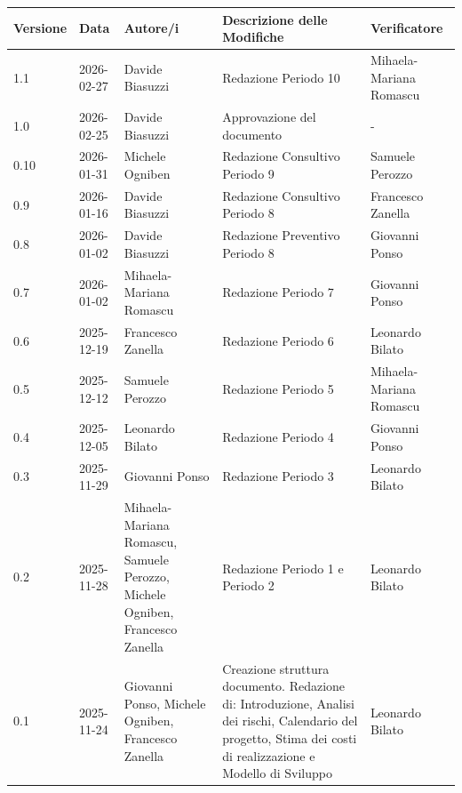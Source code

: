 \documentclass[a4paper, 11pt, oneside]{scrartcl} %
\begin{document}
\begin{center}
\renewcommand{\arraystretch}{1.2}
\begin{tabularx}{\textwidth}{@{}p{}p{}p{}X>{\centering\arraybackslash}p{}@{}}
\toprule
\textbf{Versione} & \textbf{Data} & \textbf{Autore/i} & \textbf{Descrizione delle Modifiche} & \textbf{Verificatore} \\
\midrule
1.1 & 2026-02-27 & Davide Biasuzzi & Redazione Periodo 10 & Mihaela-Mariana Romascu \\
1.0 & 2026-02-25 & Davide Biasuzzi & Approvazione del documento & - \\
0.10 & 2026-01-31 & Michele Ogniben & Redazione Consultivo Periodo 9 & Samuele Perozzo \\
0.9 & 2026-01-16 & Davide Biasuzzi & Redazione Consultivo Periodo 8 & Francesco Zanella \\
0.8 & 2026-01-02 & Davide Biasuzzi & Redazione Preventivo Periodo 8 & Giovanni Ponso \\
0.7 & 2026-01-02 & Mihaela-Mariana Romascu & Redazione Periodo 7 & Giovanni Ponso \\
0.6 & 2025-12-19 & Francesco Zanella & Redazione Periodo 6 & Leonardo Bilato \\
0.5 & 2025-12-12 & Samuele Perozzo & Redazione Periodo 5 & Mihaela-Mariana Romascu \\
0.4 & 2025-12-05 & Leonardo Bilato & Redazione Periodo 4 & Giovanni Ponso \\
0.3 & 2025-11-29 & Giovanni Ponso & Redazione Periodo 3 & Leonardo Bilato \\
0.2 & 2025-11-28 & Mihaela-Mariana Romascu, Samuele Perozzo, Michele Ogniben, Francesco Zanella & Redazione Periodo 1 e Periodo 2 & Leonardo Bilato \\
0.1 & 2025-11-24 & Giovanni Ponso, Michele Ogniben, Francesco Zanella & Creazione struttura documento. Redazione di: Introduzione, Analisi dei rischi, Calendario del progetto, Stima dei costi di realizzazione e Modello di Sviluppo & Leonardo Bilato \\
\bottomrule
\end{tabularx}
\end{center}

\newpage
\tableofcontents 
\pagestyle{fancy} 

\newpage
\end{document}
